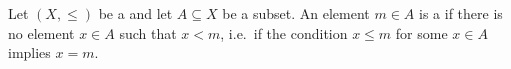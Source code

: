 \begin{definition} \label{definition:minimal_element_in_a_subset_of_a_partially_ordered_set}
Let $(X, \leq)$ be a  and let $A \subseteq X$ be a subset. An element $m \in A$ is a  if there is no element $x \in A$ such that $x < m$, i.e.\ if the condition $x \leq m$ for some $x \in A$ implies $x = m$.
\end{definition}
